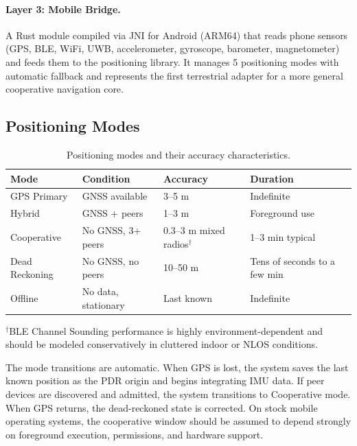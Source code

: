 \documentclass[12pt,a4paper]{article}
\begin{document}
\paragraph{Layer 3: Mobile Bridge.} A Rust module compiled via JNI for Android (ARM64) that reads phone sensors (GPS, BLE, WiFi, UWB, accelerometer, gyroscope, barometer, magnetometer) and feeds them to the positioning library. It manages 5 positioning modes with automatic fallback and represents the first terrestrial adapter for a more general cooperative navigation core.

\subsection{Positioning Modes}

\begin{table}[h]
\centering
\caption{Positioning modes and their accuracy characteristics.}
\label{tab:modes}
\begin{tabular}{@{}llll@{}}
\toprule
\textbf{Mode} & \textbf{Condition} & \textbf{Accuracy} & \textbf{Duration} \\
\midrule
GPS Primary     & GNSS available          & 3--5 m       & Indefinite \\
Hybrid          & GNSS + peers            & 1--3 m       & Foreground use \\
Cooperative     & No GNSS, 3+ peers       & 0.3--3 m mixed radios$^\dagger$ & 1--3 min typical \\
Dead Reckoning  & No GNSS, no peers       & 10--50 m     & Tens of seconds to a few min \\
Offline         & No data, stationary     & Last known   & Indefinite \\
\bottomrule
\end{tabular}
\end{table}

\begin{flushleft}
\footnotesize{$^\dagger$BLE Channel Sounding performance is highly environment-dependent and should be modeled conservatively in cluttered indoor or NLOS conditions.}
\end{flushleft}

The mode transitions are automatic. When GPS is lost, the system saves the last known position as the PDR origin and begins integrating IMU data. If peer devices are discovered and admitted, the system transitions to Cooperative mode. When GPS returns, the dead-reckoned state is corrected. On stock mobile operating systems, the cooperative window should be assumed to depend strongly on foreground execution, permissions, and hardware support.
\end{document}

